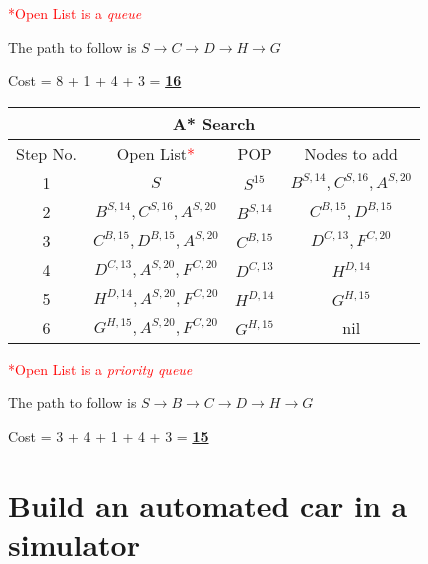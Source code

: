 \documentclass[12pt, letterpaper]{article}
\begin{document}
\textcolor{red}{*Open List is a \textit{queue}}

The path to follow is $S\rightarrow C\rightarrow D\rightarrow H\rightarrow G$

Cost = 8 + 1 + 4 + 3 = \underline{\textbf{16}}

\begin{center}
    \begin{tabular}{|c|c|c|c|}
    \hline
    \multicolumn{4}{|c|}{A* Search}\\
    \hline
    Step No. & Open List\textcolor{red}{*} & POP & Nodes to add \\ 
    \hline
    1 & $S$ & $S^{15}$ & $B^{S,14}, C^{S,16}, A^{S,20}$ \\
    \hline
    2 & $B^{S,14}, C^{S,16}, A^{S,20}$ & $B^{S,14}$ & $C^{B,15}, D^{B,15}$ \\
    \hline
    3 & $C^{B,15}, D^{B,15}, A^{S,20}$ & $C^{B,15}$ & $D^{C,13},F^{C,20}$ \\
    \hline
    4 & $D^{C,13}, A^{S,20}, F^{C,20}$ & $D^{C,13}$ & $H^{D,14}$\\
    \hline
    5 & $H^{D,14}, A^{S,20}, F^{C,20}$ & $H^{D,14}$ & $G^{H,15}$\\
    \hline
    6 & $G^{H,15}, A^{S,20}, F^{C,20}$ & $G^{H,15}$ & nil\\
    \hline
    \end{tabular}
\end{center}

\textcolor{red}{*Open List is a \textit{priority queue}}

The path to follow is $S\rightarrow B\rightarrow C\rightarrow D\rightarrow H\rightarrow G$

Cost = 3 + 4 + 1 + 4 + 3 = \underline{\textbf{15}}

\section{Build an automated car in a simulator}
\end{document}
